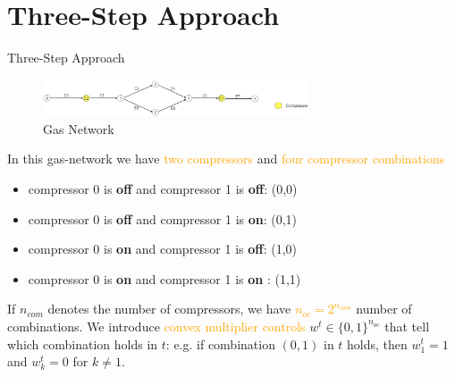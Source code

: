 \documentclass[8pt]{beamer}
\begin{document}
\section{Three-Step Approach}
\begin{frame}{Three-Step Approach}
\begin{figure}
\centering
\includegraphics[width=0.7\textwidth]{images/AdvancedNetwork2.png}
\caption{Gas Network}
\end{figure}
In this gas-network we have \textcolor{orange}{two compressors} and \textcolor{orange}{four compressor combinations}
\begin{itemize}
\item compressor 0 is \textbf{off} and  compressor 1 is \textbf{off}: (0,0)
\item compressor 0 is \textbf{off}  and  compressor 1 is \textbf{on}: (0,1)
\item compressor 0 is \textbf{on}  and  compressor 1 is \textbf{off}: (1,0)
\item compressor 0 is \textbf{on}  and  compressor 1 is \textbf{on} : (1,1)
\end{itemize} 
If $n_{com}$ denotes the number of compressors, we have \textcolor{orange}{$n_{oc}= 2^{n_{com}}$} number of combinations. \newline
We introduce \textcolor{orange}{convex multiplier controls} $w^t \in \{0,1\}^{n_{oc}}$ that tell which combination holds in $t$:  e.g. if combination $(0,1)$ in $t$ holds,  then $w_1^t=1$ and $w_k^t=0$ for $k \neq 1$. 
\end{frame}
\end{document}
